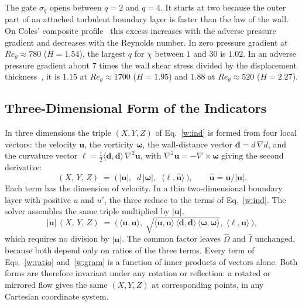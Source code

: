 \documentclass[conf]{new-aiaa}
\begin{document}
The gate $\sigma_q$ opens between $q=2$ and $q=4$. It starts at two because the
outer part of an attached turbulent boundary layer is faster than the law of
the wall. On Coles' composite profile~\cite{coles_1956} this excess increases
with the adverse pressure gradient and decreases with the Reynolds number. In
zero pressure gradient at $Re_\theta\approx780$ ($H=1.54$), the largest $q$
for $\chi$ between $1$ and $30$ is $1.02$. In an adverse pressure gradient
about $7$ times the wall shear stress divided by the displacement
thickness~\cite{das_1987}, it is $1.15$ at $Re_\theta\approx1700$ ($H=1.95$)
and $1.88$ at $Re_\theta\approx520$ ($H=2.27$).

\subsection{Three-Dimensional Form of the Indicators}

In three dimensions the triple $(X,Y,Z)$ of Eq.~\eqref{w:ind} is formed from
four local vectors: the
velocity $\mathbf u$, the vorticity $\boldsymbol\omega$, the wall-distance
vector $\mathbf d=d\,\nabla d$, and the curvature vector
$\boldsymbol\ell=\tfrac12\langle\mathbf d,\mathbf d\rangle\,\nabla^2\mathbf u$,
with $\nabla^2\mathbf u=-\nabla\times\boldsymbol\omega$ giving the second
derivative:
\begin{equation}
  (X,\,Y,\,Z) \;=\;
  \big(\,|\mathbf u|,\;\; d\,|\boldsymbol\omega|,\;\;
  \langle\boldsymbol\ell,\hat{\mathbf u}\rangle\,\big),
  \qquad \hat{\mathbf u}=\mathbf u/|\mathbf u| .
  \label{w:ratio}
\end{equation}
Each term has the dimension of velocity. In a thin two-dimensional boundary
layer with positive $u$ and $u'$, the three reduce to the terms of
Eq.~\eqref{w:ind}. The solver assembles the same triple multiplied by
$|\mathbf u|$,
\begin{equation}
  |\mathbf u|\,(X,\,Y,\,Z) \;=\;
  \Big(\,\langle\mathbf u,\mathbf u\rangle,\;
  \sqrt{\langle\mathbf u,\mathbf u\rangle\,
        \langle\mathbf d,\mathbf d\rangle\,
        \langle\boldsymbol\omega,\boldsymbol\omega\rangle},\;
  \langle\boldsymbol\ell,\mathbf u\rangle\,\Big),
  \label{w:gram}
\end{equation}
which requires no division by $|\mathbf u|$. The common factor leaves
$\hat\Omega$ and $\hat I$ unchanged, because both depend only on ratios of the
three terms. Every term of Eqs.~\eqref{w:ratio} and~\eqref{w:gram} is a
function of inner products of vectors alone. Both forms are therefore
invariant under any rotation or reflection: a rotated or mirrored flow gives
the same $(X,Y,Z)$ at corresponding points, in any Cartesian coordinate
system.
\end{document}
